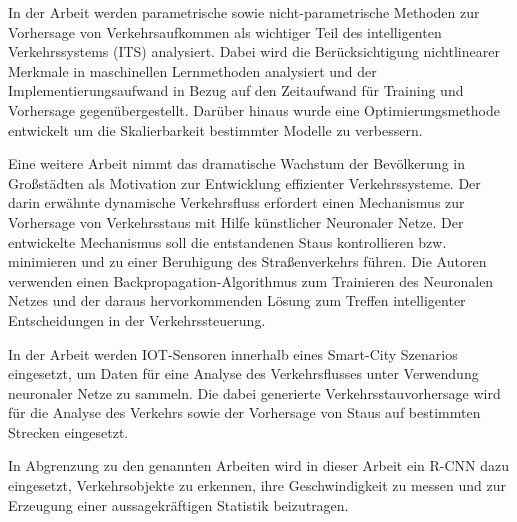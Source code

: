 In der Arbeit \cite{9148964} werden parametrische sowie nicht-parametrische Methoden zur Vorhersage von Verkehrsaufkommen als wichtiger Teil des intelligenten Verkehrssystems (ITS) analysiert. Dabei wird die Berücksichtigung nichtlinearer Merkmale in maschinellen Lernmethoden analysiert und der Implementierungsaufwand in Bezug auf den Zeitaufwand für Training und Vorhersage gegenübergestellt. Darüber hinaus wurde eine Optimierungsmethode entwickelt um die Skalierbarkeit bestimmter Modelle zu verbessern.

Eine weitere Arbeit \cite{ata2019modelling} nimmt das dramatische Wachstum der Bevölkerung in Großstädten als Motivation zur Entwicklung effizienter Verkehrssysteme. Der darin erwähnte dynamische Verkehrsfluss erfordert einen Mechanismus zur Vorhersage von Verkehrsstaus mit Hilfe künstlicher Neuronaler Netze. Der entwickelte Mechanismus soll die entstandenen Staus kontrollieren bzw. minimieren und zu einer Beruhigung des Straßenverkehrs führen. Die Autoren verwenden einen Backpropagation-Algorithmus zum Trainieren des Neuronalen Netzes und der daraus hervorkommenden Lösung zum Treffen intelligenter Entscheidungen in der Verkehrssteuerung.

In der Arbeit \cite{devi2017machine} werden \ac{IOT}-Sensoren innerhalb eines Smart-City Szenarios eingesetzt, um Daten für eine Analyse des Verkehrsflusses unter Verwendung neuronaler Netze zu sammeln. Die dabei generierte Verkehrsstauvorhersage wird für die Analyse des Verkehrs sowie der Vorhersage von Staus auf bestimmten Strecken eingesetzt.

In Abgrenzung zu den genannten Arbeiten wird in dieser Arbeit ein \ac{R-CNN} dazu eingesetzt, Verkehrsobjekte zu erkennen, ihre Geschwindigkeit zu messen und zur Erzeugung einer aussagekräftigen Statistik beizutragen.





